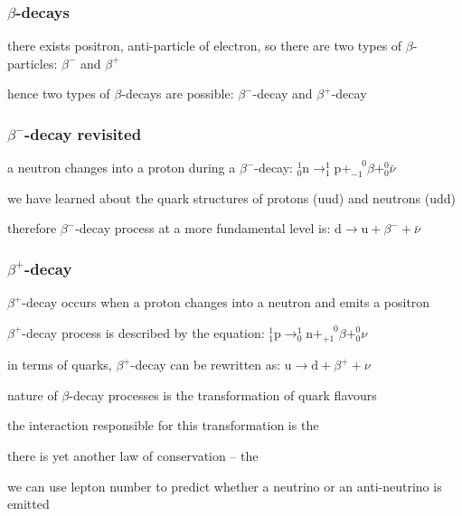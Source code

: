 \subsubsection{\texorpdfstring{$\beta$}{\textbeta}-decays}

there exists positron, anti-particle of electron, so there are two types of $\beta$-particles: $\beta^-$ and $\beta^+$

hence two types of $\beta$-decays are possible: $\beta^-$-decay and $\beta^+$-decay



\subsubsection*{\texorpdfstring{$\beta^-$}{\textbeta\textsubscript{-}}-decay revisited}

a neutron changes into a proton during a $\beta^-$-decay: $\boxed{_0^1 \text{n} \longrightarrow _1^1 \text{p} + _{-1}^{\phantom{+}0}\beta + _0^0 \bar{\nu}} $

we have learned about the quark structures of protons (uud) and neutrons (udd)

therefore $\beta^-$-decay process at a more fundamental level is: $ \boxed{\text{d} \longrightarrow \text{u} + \beta^- + \bar{\nu}} $


\subsubsection*{\texorpdfstring{$\beta^+$}{\textbeta\textsubscript{+}}-decay}


$\beta^+$-decay occurs when a proton changes into a neutron and emits a positron

$\beta^+$-decay process is described by the equation: $ \boxed{_1^1 \text{p} \longrightarrow _0^1 \text{n} + _{+1}^{\phantom{+}0}\beta + _0^0 \nu} $

in terms of quarks, $\beta^+$-decay can be rewritten as: $ \boxed{\text{u} \longrightarrow \text{d} + \beta^+ + \nu} $

\cmt nature of $\beta$-decay processes is the transformation of quark flavours

the interaction responsible for this transformation is the 

\cmt there is yet another law of conservation -- the 

we can use lepton number to predict whether a neutrino or an anti-neutrino is emitted

